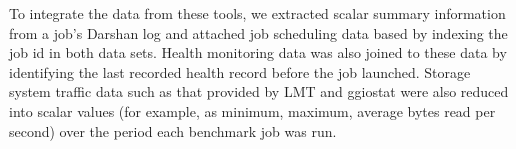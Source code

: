 To integrate the data from these tools, we extracted scalar summary information from a job's Darshan log and attached job scheduling data based by indexing the job id in both data sets.
Health monitoring data was also joined to these data by identifying the last recorded health record before the job launched.
Storage system traffic data such as that provided by LMT and ggiostat were also reduced into scalar values (for example, as minimum, maximum, average bytes read per second) over the period each benchmark job was run.



